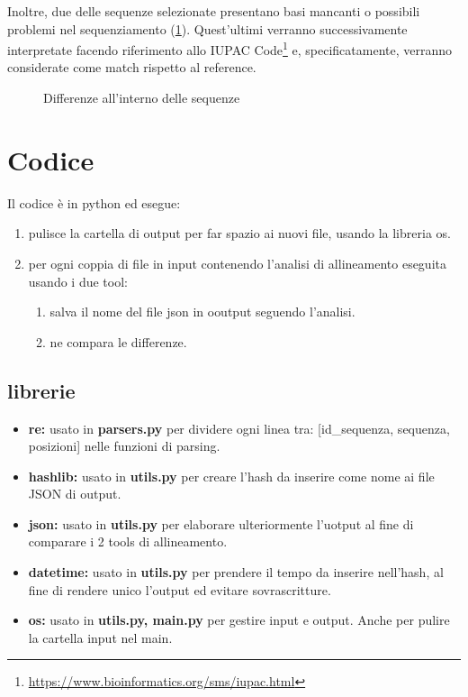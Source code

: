 \documentclass[11pt,italian]{article}
\begin{document}
Inoltre, due delle sequenze selezionate presentano basi mancanti o possibili problemi nel sequenziamento (\cref{fig:jalview-inner}).
Quest'ultimi verranno successivamente interpretate facendo riferimento allo IUPAC Code\footnote{\url{https://www.bioinformatics.org/sms/iupac.html}} e, specificatamente, verranno considerate come match rispetto al reference.

\begin{figure}[H]
  \caption{Differenze all'interno delle sequenze}
  \label{fig:jalview-inner}
\end{figure}

\section{Codice}
Il codice è in python ed esegue:
\begin{enumerate}
  \item pulisce la cartella di output per far spazio ai nuovi file, usando la libreria os.
  \item per ogni coppia di file in input contenendo l'analisi di allineamento eseguita usando i due tool:
  \begin{enumerate}
    \item salva il nome del file json in ooutput seguendo l'analisi.
    \item ne compara le differenze.
  \end{enumerate}
\end{enumerate}

\subsection{librerie}
\begin{itemize}
  \item\textbf{re:} usato in \textbf{parsers.py} per dividere ogni linea tra: [id\_sequenza, sequenza, posizioni] nelle funzioni di parsing.
  \item\textbf{hashlib:} usato in \textbf{utils.py} per creare l'hash da inserire come nome ai file JSON di output.
  \item\textbf{json:} usato in \textbf{utils.py} per elaborare ulteriormente l'uotput al fine di comparare i 2 tools di allineamento.
  \item\textbf{datetime:} usato in \textbf{utils.py} per prendere il tempo da inserire nell'hash, al fine di rendere unico l'output ed evitare sovrascritture.
  \item\textbf{os:} usato in \textbf{utils.py, main.py} per gestire input e output. Anche per pulire la cartella input nel main.
\end{itemize}
\end{document}
